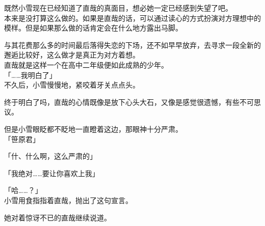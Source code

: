 既然小雪现在已经知道了直哉的真面目，想必她一定已经感到失望了吧。\\

本来是没打算这么做的。如果是直哉的话，可以通过读心的方式扮演对方理想中的模样。但是如果那么做的话肯定会在什么地方露出马脚。

与其花费那么多的时间最后落得失恋的下场，还不如早早放弃，去寻求一段全新的邂逅比较好，这么做才是真正为对方着想。\\

直哉就是这样一个在高中二年级便如此成熟的少年。\\

「……我明白了」\\

不久后，小雪慢慢地，紧咬着牙关点点头。

终于明白了吗，直哉的心情既像是放下心头大石，又像是感觉很遗憾，有些不可思议。

但是小雪眼眨都不眨地一直瞪着这边，那眼神十分严肃。\\

「笹原君」

「什、什么啊，这么严肃的」

「我绝对……要让你喜欢上我」

「哈……？」\\

小雪用食指指着直哉，抛出了这句宣言。

她对着惊讶不已的直哉继续说道。\\

